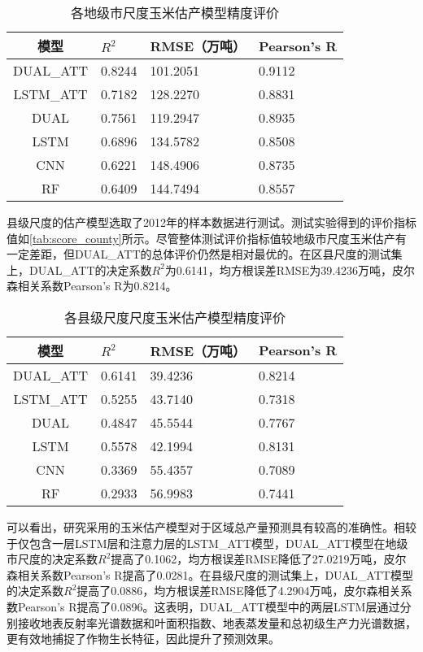 \begin{table}
  \centering
  \caption{各地级市尺度玉米估产模型精度评价}
  \label{tab:score_city}
  \begin{tabularx}{\linewidth}{cX<{\centering}X<{\centering}X<{\centering}}
      \toprule
      模型 & $R^2$ & RMSE（万吨） & Pearson's R \\
      \midrule
      DUAL\_ATT & 0.8244 & 101.2051 & 0.9112 \\
      LSTM\_ATT & 0.7182 & 128.2270 & 0.8831 \\
      DUAL & 0.7561 & 119.2947 & 0.8935 \\
      LSTM & 0.6896 & 134.5782 & 0.8508 \\
      CNN & 0.6221 & 148.4906 & 0.8735 \\
      RF & 0.6409 & 144.7494 & 0.8557 \\ 
      \bottomrule
  \end{tabularx}
\end{table}

\par 县级尺度的估产模型选取了2012年的样本数据进行测试。测试实验得到的评价指标值如\autoref{tab:score_county}所示。尽管整体测试评价指标值较地级市尺度玉米估产有一定差距，但DUAL\_ATT的总体评价仍然是相对最优的。在区县尺度的测试集上，DUAL\_ATT的决定系数$R^2$为0.6141，均方根误差RMSE为39.4236万吨，皮尔森相关系数Pearson's R为0.8214。

\begin{table}
  \centering
  \caption{各县级尺度尺度玉米估产模型精度评价}
  \label{tab:score_county}
  \begin{tabularx}{\linewidth}{cX<{\centering}X<{\centering}X<{\centering}}
      \toprule
      模型 & $R^2$ & RMSE（万吨） & Pearson's R \\
      \midrule
      DUAL\_ATT & 0.6141 & 39.4236 & 0.8214 \\
      LSTM\_ATT & 0.5255 & 43.7140 & 0.7318 \\
      DUAL & 0.4847 & 45.5544 & 0.7767 \\
      LSTM & 0.5578 & 42.1994 & 0.8131 \\
      CNN & 0.3369 & 55.4357 & 0.7089 \\
      RF & 0.2933 & 56.9983 & 0.7441 \\ 
      \bottomrule
  \end{tabularx}
\end{table}

\par 可以看出，研究采用的玉米估产模型对于区域总产量预测具有较高的准确性。相较于仅包含一层LSTM层和注意力层的LSTM\_ATT模型，DUAL\_ATT模型在地级市尺度的决定系数$R^2$提高了0.1062，均方根误差RMSE降低了27.0219万吨，皮尔森相关系数Pearson's R提高了0.0281。在县级尺度的测试集上，DUAL\_ATT模型的决定系数$R^2$提高了0.0886，均方根误差RMSE降低了4.2904万吨，皮尔森相关系数Pearson's R提高了0.0896。这表明，DUAL\_ATT模型中的两层LSTM层通过分别接收地表反射率光谱数据和叶面积指数、地表蒸发量和总初级生产力光谱数据，更有效地捕捉了作物生长特征，因此提升了预测效果。

